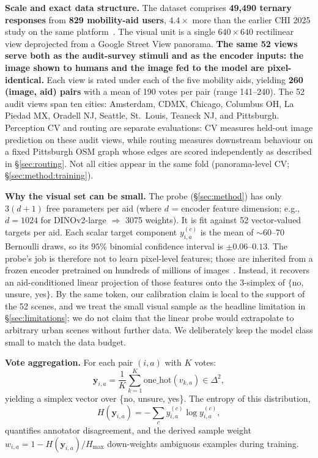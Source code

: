\documentclass[conference]{IEEEtran}
\newcommand{\hmax}{H_{\max}}
\begin{document}
\textbf{Scale and exact data structure.} The dataset comprises \textbf{49{,}490 ternary responses} from \textbf{829 mobility-aid users}, $4.4\times$ more than the earlier CHI 2025 study on the same platform~\cite{DBLP:journals/corr/abs-2502-19888}. The visual unit is a single $640\times640$ rectilinear view deprojected from a Google Street View panorama. \textbf{The same 52 views serve both as the audit-survey stimuli and as the encoder inputs: the image shown to humans and the image fed to the model are pixel-identical.} Each view is rated under each of the five mobility aids, yielding \textbf{260 (image, aid) pairs} with a mean of 190 votes per pair (range 141--240). The 52 audit views span ten cities: Amsterdam, CDMX, Chicago, Columbus OH, La Piedad MX, Oradell NJ, Seattle, St.\ Louis, Teaneck NJ, and Pittsburgh. Perception CV and routing are separate evaluations: CV measures held-out image prediction on these audit views, while routing measures downstream behaviour on a fixed Pittsburgh OSM graph whose edges are scored independently as described in \S\ref{sec:routing}. Not all cities appear in the same fold (panorama-level CV; \S\ref{sec:method:training}).

\textbf{Why the visual set can be small.} The probe (\S\ref{sec:method}) has only $3(d+1)$ free parameters per aid (where $d$ = encoder feature dimension; e.g., $d=1024$ for DINOv2-large $\Rightarrow$ 3075 weights). It is fit against 52 vector-valued targets per aid. Each scalar target component $y^{(c)}_{i,a}$ is the mean of $\sim$60--70 Bernoulli draws, so its $95\%$ binomial confidence interval is $\pm 0.06$--$0.13$. The probe's job is therefore not to learn pixel-level features; those are inherited from a frozen encoder pretrained on hundreds of millions of images~\cite{radford2021learningtransferablevisualmodels,oquab2023dinov2,tschannen2025siglip2}. Instead, it recovers an aid-conditioned linear projection of those features onto the 3-simplex of $\{$no, unsure, yes$\}$. By the same token, our calibration claim is local to the support of the 52 scenes, and we treat the small visual sample as the headline limitation in \S\ref{sec:limitations}; we do not claim that the linear probe would extrapolate to arbitrary urban scenes without further data. We deliberately keep the model class small to match the data budget.

\textbf{Vote aggregation.} For each pair $(i,a)$ with $K$ votes:
\begin{equation}
\mathbf{y}_{i,a} = \frac{1}{K}\sum_{k=1}^{K} \mathrm{one\_hot}(v_{k,a}) \in \Delta^2,
\label{eq:softlabel}
\end{equation}
yielding a simplex vector over \{no, unsure, yes\}. The entropy of this distribution,
\begin{equation}
H(\mathbf{y}_{i,a}) = -\sum_c y_{i,a}^{(c)} \log y_{i,a}^{(c)},
\end{equation}
quantifies annotator disagreement, and the derived sample weight $w_{i,a} = 1 - H(\mathbf{y}_{i,a})/\hmax$ down-weights ambiguous examples during training.
\end{document}
